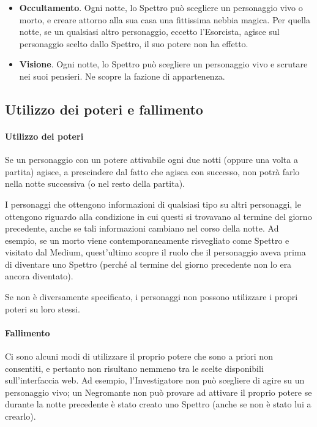 \documentclass[a4paper,10pt]{article}
\begin{document}
\begin{itemize}
 \item {\bf Occultamento}. Ogni notte, lo Spettro può scegliere un personaggio
vivo o morto, e creare attorno alla sua casa una fittissima nebbia magica. Per
quella notte, se un qualsiasi altro personaggio, eccetto l'Esorcista, agisce sul
personaggio scelto dallo Spettro, il suo potere non ha effetto.
 
 \item {\bf Visione}. Ogni notte, lo Spettro può scegliere un personaggio vivo e
scrutare nei suoi pensieri. Ne scopre la fazione di appartenenza.
 
\end{itemize}


\subsection{Utilizzo dei poteri e fallimento}
\label{fallimento}

\paragraph{Utilizzo dei poteri} 
Se un personaggio con un potere attivabile ogni due notti (oppure una volta a
partita) agisce, a prescindere dal fatto che agisca con successo, non potrà
farlo nella notte successiva (o nel resto della partita).

I personaggi che ottengono informazioni di qualsiasi tipo su altri personaggi,
le ottengono riguardo alla condizione in cui questi si trovavano al termine del
giorno precedente, anche se tali informazioni cambiano nel corso della notte.
Ad esempio, se un morto viene contemporaneamente risvegliato come Spettro e
visitato dal Medium, quest'ultimo scopre il ruolo che il personaggio aveva prima
di diventare uno Spettro (perché al termine del giorno precedente non lo era
ancora diventato).

Se non è diversamente specificato, i personaggi non possono utilizzare i propri
poteri su loro stessi.

\paragraph{Fallimento} Ci sono alcuni modi di utilizzare il proprio potere che
sono a priori non consentiti, e pertanto non risultano nemmeno tra le scelte
disponibili sull'interfaccia web. Ad esempio, l'Investigatore non può scegliere
di agire su un personaggio vivo; un Negromante non può provare ad
attivare il proprio potere se durante la notte precedente è stato creato uno
Spettro (anche se non è stato lui a crearlo).
\end{document}
